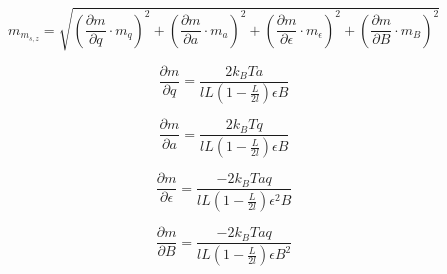 \documentclass[a4paper,parskip,11pt, DIV12]{scrreprt}
\begin{document}
\begin{equation}
m_{m_{s,z}}=\sqrt{(\frac{\partial m}{\partial q} \cdot m_q)^2+(\frac{\partial m}{\partial a} \cdot m_a)^2+(\frac{\partial m}{\partial \epsilon} \cdot m_\epsilon)^2+(\frac{\partial m}{\partial B} \cdot m_B)^2}
\end{equation}

\begin{equation}
\frac{\partial m}{\partial q} = \frac{2k_BTa}{lL(1-\frac{L}{2l})\epsilon B}
\end{equation}

\begin{equation}
\frac{\partial m}{\partial a} = \frac{2k_BTq}{lL(1-\frac{L}{2l})\epsilon B}
\end{equation}

\begin{equation}
\frac{\partial m}{\partial \epsilon} = \frac{-2k_BTaq}{lL(1-\frac{L}{2l})\epsilon^2 B}
\end{equation}

\begin{equation}
\frac{\partial m}{\partial B} = \frac{-2k_BTaq}{lL(1-\frac{L}{2l})\epsilon B^2}
\end{equation}


\clearpage
 

\end{document}
